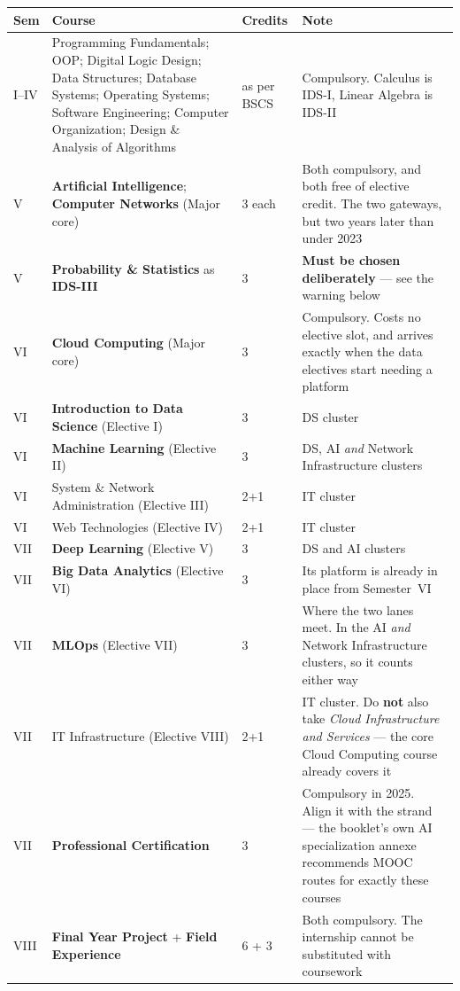 \documentclass[11pt,a4paper,oneside]{report}
\begin{document}
\begin{longtable}{@{}L{1.7cm}L{6.4cm}L{2.2cm}L{5.0cm}@{}}
\toprule
{}
\textbf{Sem} & \textbf{Course} & \textbf{Credits} & \textbf{Note} \\
\midrule
\endhead
I--IV & Programming Fundamentals; OOP; Digital Logic Design; Data Structures;
Database Systems; Operating Systems; Software Engineering; Computer Organization;
Design \& Analysis of Algorithms & as per BSCS &
Compulsory. Calculus is IDS-I, Linear Algebra is IDS-II \\
V & \textbf{Artificial Intelligence}; \textbf{Computer Networks} (Major core) & 3 each &
Both compulsory, and both free of elective credit. The two gateways, but two
years later than under 2023 \\
V & \textbf{Probability \& Statistics} as \textbf{IDS-III} & 3 &
\textbf{Must be chosen deliberately} --- see the warning below \\
VI & \textbf{Cloud Computing} (Major core) & 3 &
Compulsory. Costs no elective slot, and arrives exactly when the data electives
start needing a platform \\
VI & \textbf{Introduction to Data Science} (Elective I) & 3 & DS cluster \\
VI & \textbf{Machine Learning} (Elective II) & 3 &
DS, AI \emph{and} Network Infrastructure clusters \\
VI & System \& Network Administration (Elective III) & 2+1 & IT cluster \\
VI & Web Technologies (Elective IV) & 2+1 & IT cluster \\
VII & \textbf{Deep Learning} (Elective V) & 3 & DS and AI clusters \\
VII & \textbf{Big Data Analytics} (Elective VI) & 3 &
Its platform is already in place from Semester~VI \\
VII & \textbf{MLOps} (Elective VII) & 3 &
Where the two lanes meet. In the AI \emph{and} Network Infrastructure clusters,
so it counts either way \\
VII & IT Infrastructure (Elective VIII) & 2+1 &
IT cluster. Do \textbf{not} also take \emph{Cloud Infrastructure and Services} ---
the core Cloud Computing course already covers it \\
VII & \textbf{Professional Certification} & 3 &
Compulsory in 2025. Align it with the strand --- the booklet's own AI
specialization annexe recommends MOOC routes for exactly these courses \\
VIII & \textbf{Final Year Project} + \textbf{Field Experience} & 6 + 3 &
Both compulsory. The internship cannot be substituted with coursework \\
\bottomrule
\end{longtable}
\end{document}
